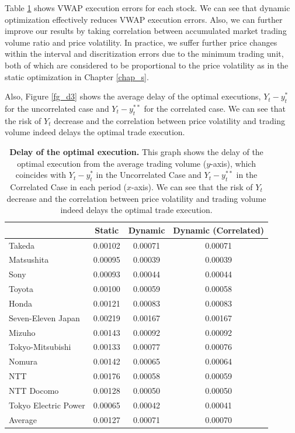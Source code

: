 Table \ref{table_d1} shows VWAP execution errors for each stock.  We can see 
that dynamic optimization effectively reduces VWAP execution errors.  Also, we 
can further improve our results by taking correlation between accumulated market 
trading volume ratio and price volatility.  In practice, we suffer further price 
changes within the interval and discritization errors due to the minimum trading 
unit, both of which are considered to be proportional to the price volatility as 
in the static optimization in Chapter \ref{chap_s}.

Also, Figure \ref{fg_d3} shows the average delay of the optimal executions, 
$Y_t- y_t^*$ for the uncorrelated case and $Y_t- y_t^{**}$ for the correlated 
case.  We can see that the risk of $Y_t$ decrease and the correlation between 
price volatility and trading volume indeed delays the optimal trade execution.


\begin{table}[htbp]
\begin{center}
\begin{tabular}{|l||c|c|c|} \hline
 & Static & Dynamic & Dynamic (Correlated) \\ \hline\hline
 Takeda & 0.00102 & 0.00071 & 0.00071 \\ \hline
 Matsushita & 0.00095 & 0.00039 & 0.00039 \\ \hline
 Sony & 0.00093 & 0.00044 & 0.00044 \\ \hline
 Toyota & 0.00100 & 0.00059 & 0.00058 \\ \hline
 Honda & 0.00121 & 0.00083 & 0.00083 \\ \hline
 Seven-Eleven Japan & 0.00219 & 0.00167 & 0.00167 \\ \hline
 Mizuho	& 0.00143 & 0.00092 & 0.00092 \\ \hline
 Tokyo-Mitsubishi & 0.00133 & 0.00077 & 0.00076 \\ \hline
 Nomura & 0.00142 & 0.00065 & 0.00064 \\ \hline
 NTT & 0.00176 & 0.00058 & 0.00059 \\ \hline
 NTT Docomo & 0.00128 & 0.00050 & 0.00050 \\ \hline
 Tokyo Electric Power & 0.00065 & 0.00042 & 0.00041 \\ \hline\hline
 Average & 0.00127 & 0.00071 & 0.00070 \\ \hline
\end{tabular}
\end{center}
\caption[Delay of the optimal execution]{{\bf Delay of the optimal execution.}
 \quad This graph shows the delay of the optimal execution from the average 
trading volume ($y$-axis), which coincides with $Y_t- y_t^*$ in the Uncorrelated 
Case and $Y_t- y_t^{**}$ in the Correlated Case in each period ($x$-axis).  We 
can see that the risk of $Y_t$ decrease and the correlation between price 
volatility and trading volume indeed delays the optimal trade 
execution.}\label{table_d1}
\end{table}


